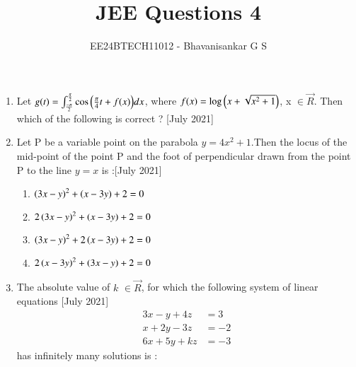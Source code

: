 \documentclass[journal,12pt,onecolumn]{IEEEtran}
\theoremstyle{remark}
\begin{document}

\vspace{3cm}

\title{JEE Questions 4}
\author{EE24BTECH11012 - Bhavanisankar G S}
\maketitle
\newpage
\bigskip

\renewcommand{\thefigure}{\theenumi}
\renewcommand{\thetable}{\theenumi}
\begin{enumerate}
	 	
	\item Let $ g(t) = \int_{\frac{- \pi}{2}}^{\frac{\pi}{2}} \cos{\ensuremath{\left(\frac{\pi}{4}t + f(x)\right)}} dx$, where $f(x) = \log{\ensuremath{\left(x + \sqrt{x^2 + 1}\right)}}$, x $\in \vec{R}$. Then which of the following is correct ? \hfill{[July 2021]}
	 \begin{enumerate}
	 \end{enumerate}
 \item Let P be a variable point on the parabola $y=4x^2+1$.Then the locus of the mid-point of the point P and the foot of perpendicular drawn from the point P to the line $y=x$ is :\hfill{[July 2021]}
	 \begin{enumerate}
		 \item $\left(3x-y\right)^2 + \left(x-3y\right) + 2 = 0$
		 \item $2 \left(3x-y\right)^2 + \left(x-3y\right) + 2 = 0$
		 \item $\left(3x-y\right)^2 + 2\left(x-3y\right) + 2 = 0$
		 \item $2 \left(x-3y\right)^2 + \left(3x-y\right) + 2 = 0$
	 \end{enumerate}
\item The absolute value of $k$ $ \in \vec{R}$, for which the following system of linear equations \hfill{[July 2021]}
		\begin{align}
			3x - y + 4z &= 3 \\ 
			x + 2y - 3z &= -2 \\
			6x + 5y + kz &= -3 
		\end{align}
		has infinitely many solutions is :
	\begin{enumerate}

\end{enumerate}
\end{enumerate}
\end{document}
